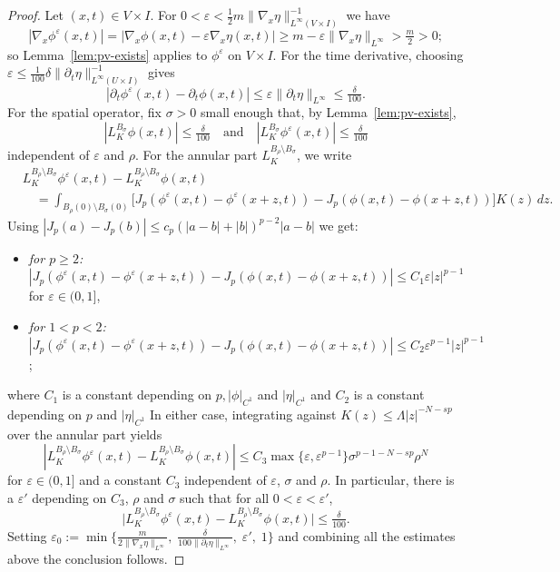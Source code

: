 \documentclass[11pt, a4paper, twoside]{article}
\theoremstyle{definition}
\theoremstyle{remark}
\begin{document}
\begin{proof}
Let $(x,t) \in V \times I$. For $0<\varepsilon < \tfrac{1}{2}m\|\nabla_x\eta\|_{L^\infty(V
\times I)}^{-1}$ we have
\[
  |\nabla_x\phi^\varepsilon(x,t)|
  = |\nabla_x\phi(x,t) - \varepsilon\nabla_x\eta(x,t)|
  \ge m - \varepsilon\|\nabla_x\eta\|_{L^\infty}
  > \tfrac{m}{2} > 0;
\]
so Lemma~\ref{lem:pv-exists} applies to
$\phi^\varepsilon$ on $V \times I$. For the time
derivative, choosing
$\varepsilon \le \tfrac{1}{100}\delta\|\partial_t\eta\|_{L^\infty(U
\times I)}^{-1}$ gives
\[
  |\partial_t\phi^\varepsilon(x,t) -  \partial_t\phi(x,t)| \leq
   \varepsilon\|\partial_t\eta\|_{L^\infty}
  \leq \tfrac{\delta}{100}.
\]
For the spatial operator, fix $\sigma > 0$ small enough
that, by Lemma~\ref{lem:pv-exists},
\[
  |L_K^{B_\sigma}\phi(x,t)| \le \tfrac{\delta}{100}
  \quad \text{and} \quad
  |L_K^{B_\sigma}\phi^\varepsilon(x,t)|
  \le \tfrac{\delta}{100}
\]
 independent of $\varepsilon$ and $\rho$.  For the annular part
$L_K^{B_\rho \setminus B_\sigma}$, we write
\begin{align*}
  &L_K^{B_\rho \setminus B_\sigma}
    \phi^\varepsilon(x,t)
  - L_K^{B_\rho \setminus B_\sigma}\phi(x,t) \\
  &\quad = \int_{B_\rho(0) \setminus B_\sigma(0)}
    \bigl[J_p(\phi^\varepsilon(x,t)
           -\phi^\varepsilon(x+z,t))
    - J_p(\phi(x,t)-\phi(x+z,t))\bigr]
    K(z)\,dz.
\end{align*}
 Using $|J_p(a) - J_p(b)| \le c_p(|a-b| + |b|)^{p-2}|a-b|$ we get:
\begin{itemize}
  \item \emph{for $p \ge 2$:}
    $|J_p(\phi^\varepsilon(x,t)
           -\phi^\varepsilon(x+z,t))
    - J_p(\phi(x,t)-\phi(x+z,t))|
    \le C_1\varepsilon|z|^{p-1}$ for $ \varepsilon \in (0,1]$,
  \item \emph{for $1 < p < 2$:}
    $|J_p(\phi^\varepsilon(x,t)
           -\phi^\varepsilon(x+z,t))
    - J_p(\phi(x,t)-\phi(x+z,t))|
    \le C_2\varepsilon^{p-1}|z|^{p-1}$;
\end{itemize}
where $C_1$ is a constant depending on $p,|\phi|_{C^1}$ and $|\eta|_{C^1}$ and $C_2$ is a constant depending on $p$ and $ |\eta|_{C^1}$  In either case, integrating against
$K(z) \le \Lambda|z|^{-N-sp}$ over the annular part yields
\[
|L_K^{B_\rho \setminus B_\sigma}
    \phi^\varepsilon(x,t)
  - L_K^{B_\rho \setminus B_\sigma}\phi(x,t) | \leq C_3\max\{\varepsilon, \varepsilon^{p-1}\}\sigma^{p-1-N-sp}\rho^{N}
\]
for $ \varepsilon \in (0,1]$ and a constant $C_3$ independent of $\varepsilon$, $\sigma$ and $\rho$. In particular, there is a $\varepsilon'$ depending on $C_3$, $\rho$ and $\sigma$ such that for all $0 < \varepsilon < \varepsilon'$,
\[
  \bigl|L_K^{B_\rho \setminus B_\sigma}
    \phi^\varepsilon(x,t)
  - L_K^{B_\rho \setminus B_\sigma}\phi(x,t)\bigr|
  \le \tfrac{\delta}{100}.
\]
Setting
$\varepsilon_0 := \min\bigl\{
  \tfrac{m}{2\|\nabla_x\eta\|_{L^\infty}},\;
  \tfrac{\delta}{100\|\partial_t\eta\|_{L^\infty}},\;
  \varepsilon',\; 1\bigr\}$
and combining all the estimates above the conclusion follows. 
\end{proof}
\end{document}
